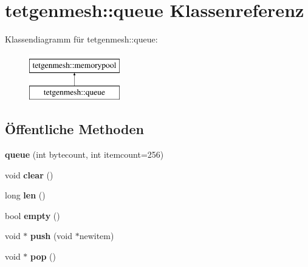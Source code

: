 \hypertarget{classtetgenmesh_1_1queue}{\section{tetgenmesh\-:\-:queue Klassenreferenz}
\label{classtetgenmesh_1_1queue}
}
Klassendiagramm für tetgenmesh\-:\-:queue\-:\begin{figure}[H]
\begin{center}
\leavevmode
\includegraphics[height=2.000000cm]{classtetgenmesh_1_1queue}
\end{center}
\end{figure}
\subsection*{Öffentliche Methoden}
\begin{DoxyCompactItemize}
\item 
\hypertarget{classtetgenmesh_1_1queue_a2000ba9bf2ea76635f06cf20c5ba7eae}{{\bfseries queue} (int bytecount, int itemcount=256)}\label{classtetgenmesh_1_1queue_a2000ba9bf2ea76635f06cf20c5ba7eae}

\item 
\hypertarget{classtetgenmesh_1_1queue_a30e7befe233d0421ae6bfdb846996300}{void {\bfseries clear} ()}\label{classtetgenmesh_1_1queue_a30e7befe233d0421ae6bfdb846996300}

\item 
\hypertarget{classtetgenmesh_1_1queue_acb5b501909b61fa5dd0a06ff583c030b}{long {\bfseries len} ()}\label{classtetgenmesh_1_1queue_acb5b501909b61fa5dd0a06ff583c030b}

\item 
\hypertarget{classtetgenmesh_1_1queue_a5b89d05d19516c2b712501eb696ff1b4}{bool {\bfseries empty} ()}\label{classtetgenmesh_1_1queue_a5b89d05d19516c2b712501eb696ff1b4}

\item 
\hypertarget{classtetgenmesh_1_1queue_aa871e54335d68dc45100a0c498d2602d}{void $\ast$ {\bfseries push} (void $\ast$newitem)}\label{classtetgenmesh_1_1queue_aa871e54335d68dc45100a0c498d2602d}

\item 
\hypertarget{classtetgenmesh_1_1queue_aeeb4ecff4f27306d5f24b73522d65661}{void $\ast$ {\bfseries pop} ()}\label{classtetgenmesh_1_1queue_aeeb4ecff4f27306d5f24b73522d65661}

\end{DoxyCompactItemize}
